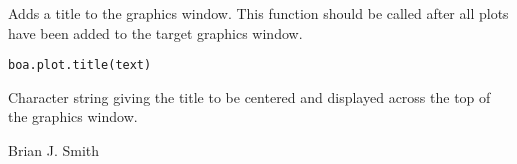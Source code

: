 \begin{Description}\relax
Adds a title to the graphics window. This function should be called after all 
plots have been added to the target graphics window.
\end{Description}
\begin{Usage}
\begin{verbatim}
boa.plot.title(text)
\end{verbatim}
\end{Usage}
\begin{Arguments}
\begin{ldescription}
\item[\code{text}] Character string giving the title to be centered and displayed 
across the top of the graphics window.
\end{ldescription}
\end{Arguments}
\begin{Author}\relax
Brian J. Smith
\end{Author}


